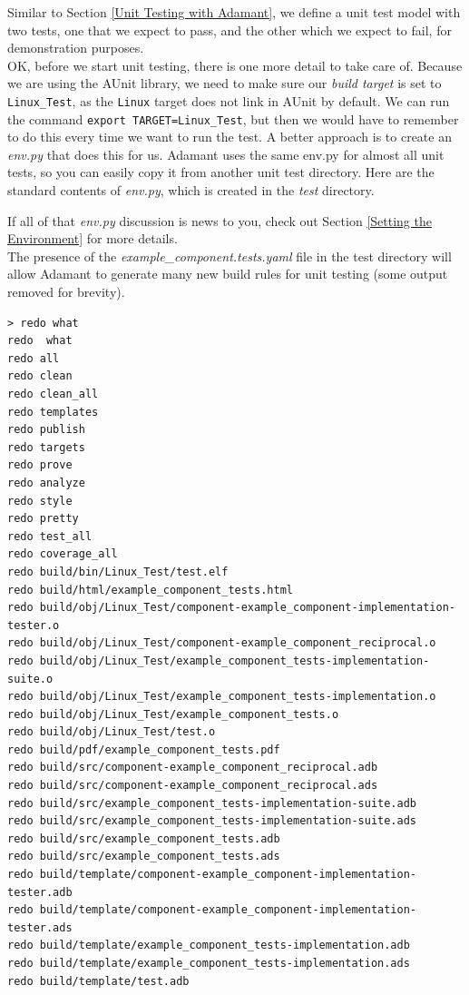 
Similar to Section \ref{Unit Testing with Adamant}, we define a unit test model with two tests, one that we expect to pass, and the other which we expect to fail, for demonstration purposes. \\

OK, before we start unit testing, there is one more detail to take care of. Because we are using the AUnit library, we need to make sure our \textit{build target} is set to \texttt{Linux\_Test}, as the \texttt{Linux} target does not link in AUnit by default. We can run the command \texttt{export TARGET=Linux\_Test}, but then we would have to remember to do this every time we want to run the test. A better approach is to create an \textit{env.py} that does this for us. Adamant uses the same env.py for almost all unit tests, so you can easily copy it from another unit test directory. Here are the standard contents of \textit{env.py}, which is created in the \textit{test} directory.


If all of that \textit{env.py} discussion is news to you, check out Section \ref{Setting the Environment} for more details. \\

The presence of the \textit{example\_component.tests.yaml} file in the test directory will allow Adamant to generate many new build rules for unit testing (some output removed for brevity). \\

\vspace{5mm} %
\begin{verbatim}
> redo what
redo  what
redo all
redo clean
redo clean_all
redo templates
redo publish
redo targets
redo prove
redo analyze
redo style
redo pretty
redo test_all
redo coverage_all
redo build/bin/Linux_Test/test.elf
redo build/html/example_component_tests.html
redo build/obj/Linux_Test/component-example_component-implementation-tester.o
redo build/obj/Linux_Test/component-example_component_reciprocal.o
redo build/obj/Linux_Test/example_component_tests-implementation-suite.o
redo build/obj/Linux_Test/example_component_tests-implementation.o
redo build/obj/Linux_Test/example_component_tests.o
redo build/obj/Linux_Test/test.o
redo build/pdf/example_component_tests.pdf
redo build/src/component-example_component_reciprocal.adb
redo build/src/component-example_component_reciprocal.ads
redo build/src/example_component_tests-implementation-suite.adb
redo build/src/example_component_tests-implementation-suite.ads
redo build/src/example_component_tests.adb
redo build/src/example_component_tests.ads
redo build/template/component-example_component-implementation-tester.adb
redo build/template/component-example_component-implementation-tester.ads
redo build/template/example_component_tests-implementation.adb
redo build/template/example_component_tests-implementation.ads
redo build/template/test.adb
\end{verbatim}
\vspace{5mm} %

